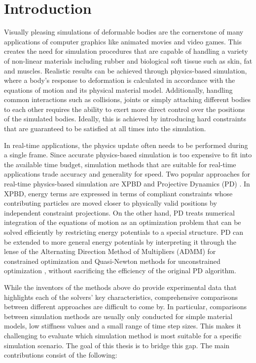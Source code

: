 \chapter{Introduction}\label{ch:introduction}
Visually pleasing simulations of deformable bodies are the cornerstone of many applications of computer graphics like animated movies and video games.
This creates the need for simulation procedures that are capable of handling a variety of non-linear materials including rubber and biological soft 
tissue such as skin, fat and muscles. Realistic results can be achieved through physics-based simulation, where a body's response to deformation is 
calculated in accordance with the equations of motion and its physical material model. Additionally, handling common interactions such as collisions, 
joints or simply attaching different bodies to each other requires the ability to exert more direct control over the positions of the simulated bodies. 
Ideally, this is achieved by introducing hard constraints that are guaranteed to be satisfied at all times into the simulation.

In real-time applications, the physics update often needs to be performed during a single frame. Since accurate physics-based simulation is too 
expensive to fit into the available time budget, simulation methods that are suitable for real-time applications trade accuracy 
and generality for speed. Two popular approaches for real-time physics-based simulation are XPBD \cite{macklin2016} and Projective Dynamics (PD) 
\cite{bouaziz2014}. In XPBD, energy terms are expressed in terms of compliant constraints whose contributing particles are moved closer to physically 
valid positions by independent constraint projections. On the other hand, PD treats numerical integration of the equations of motion as an optimization 
problem that can be solved efficiently by restricting energy potentials to a special structure. PD can be extended to more general energy potentials 
by interpreting it through the lense of the Alternating Direction Method of Multipliers (ADMM) for constrained optimization \cite{overby2017} and 
Quasi-Newton methods for unconstrained optimization \cite{liu2017}, without sacrificing the efficiency of the original PD algorithm. 

While the inventors of the methods above do provide experimental data that highlights each of the solvers' key characteristics, comprehensive 
comparisons between different approaches are difficult to come by. In particular, comparisons between simulation methods are usually only conducted 
for simple material models, low stiffness values and a small range of time step sizes. This makes it challenging to evaluate which simulation method 
is most suitable for a specific simulation scenario. The goal of this thesis is to bridge this gap. The main contributions consist of the following:

